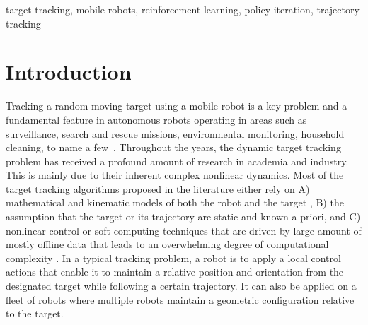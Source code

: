 \documentclass[conference]{IEEEtran}
\begin{document}
\begin{IEEEkeywords}
target tracking, mobile robots, reinforcement learning, policy iteration, trajectory tracking
\end{IEEEkeywords}


\section{Introduction}
\label{sec:introduction}


Tracking a random moving target using a mobile robot is a key problem and a fundamental feature in autonomous robots operating in areas such as surveillance, search and rescue missions, environmental monitoring, household cleaning, to name a few~\cite{kolling2006,Encarnacao2001,Ju2001,Kitowski2012,Zhang2013}. Throughout the years, the dynamic target tracking problem has received a profound amount of research in academia and industry. This is mainly due to their inherent complex nonlinear dynamics. Most of the target tracking algorithms proposed in the literature either rely on A) mathematical and kinematic models of both the robot and the target \cite{Huang2008}, B) the assumption that the target or its trajectory are static and known a priori, and C) nonlinear control or soft-computing techniques that are driven by large amount of mostly offline data that leads to an overwhelming degree of computational complexity \cite{KD2007,Cren2017}. In a typical tracking problem, a robot is to apply a local control actions that enable it to maintain a relative position and orientation from the designated target while following a certain trajectory. It can also be applied on a fleet of robots where multiple robots maintain a geometric configuration relative to the target\cite{Oh2015-Survey,Liu2017-Modular}.



\end{document}
